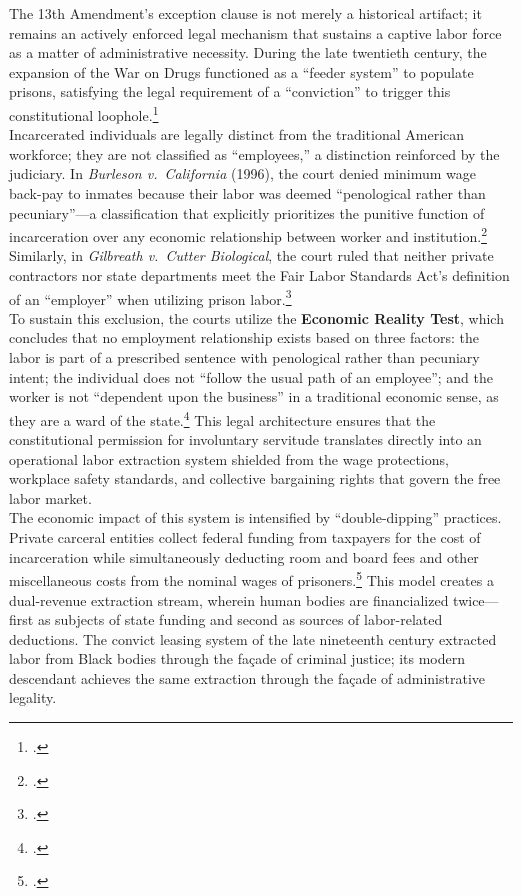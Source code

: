\documentclass[
]{article}
\begin{document}
The 13th Amendment's exception clause is not merely a historical
artifact; it remains an actively enforced legal mechanism that sustains a
captive labor force as a matter of administrative necessity. During the
late twentieth century, the expansion of the War on Drugs functioned as
a ``feeder system'' to populate prisons, satisfying the legal
requirement of a ``conviction'' to trigger this constitutional
loophole.\footcite{princeton_legal_journal}\\
Incarcerated individuals are legally distinct from the traditional
American workforce; they are not classified as ``employees,'' a
distinction reinforced by the judiciary. In \emph{Burleson v.\
California} (1996), the court denied minimum wage back-pay to inmates
because their labor was deemed ``penological rather than pecuniary''---a
classification that explicitly prioritizes the punitive function of
incarceration over any economic relationship between worker and
institution.\footcite{burleson_v_california} Similarly, in
\emph{Gilbreath v.\ Cutter Biological}, the court ruled that neither
private contractors nor state departments meet the Fair Labor Standards
Act's definition of an ``employer'' when utilizing prison
labor.\footcite{gilbreath_v_cutter}\\
To sustain this exclusion, the courts utilize the \textbf{Economic
Reality Test}, which concludes that no employment relationship exists
based on three factors: the labor is part of a prescribed sentence with
penological rather than pecuniary intent; the individual does not
``follow the usual path of an employee''; and the worker is not
``dependent upon the business'' in a traditional economic sense, as they
are a ward of the state.\footcite{princeton_legal_journal} This legal
architecture ensures that the constitutional permission for involuntary
servitude translates directly into an operational labor extraction
system shielded from the wage protections, workplace safety standards,
and collective bargaining rights that govern the free labor market.\\
The economic impact of this system is intensified by ``double-dipping''
practices. Private carceral entities collect federal funding from
taxpayers for the cost of incarceration while simultaneously deducting
room and board fees and other miscellaneous costs from the nominal wages
of prisoners.\footcite{princeton_legal_journal} This model creates a
dual-revenue extraction stream, wherein human bodies are financialized
twice---first as subjects of state funding and second as sources of
labor-related deductions. The convict leasing system of the late
nineteenth century extracted labor from Black bodies through the façade
of criminal justice; its modern descendant achieves the same extraction
through the façade of administrative legality.
\end{document}
